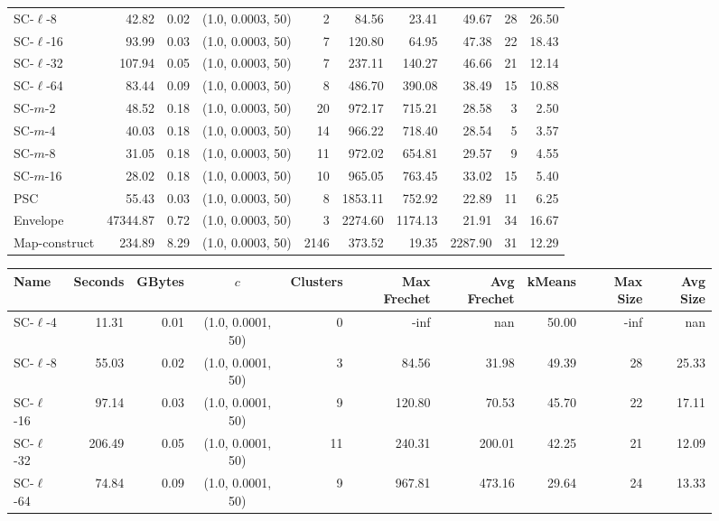 \documentclass[11pt]{article}
\begin{document}
\begin{figure}
\begin{center}
\begin{minipage}{\textwidth}
{\begin{tabular}{@{}lrrcrrrrrr@{}}
        SC-$\ell$-8 & 42.82 & 0.02 & (1.0, 0.0003, 50) & 2 & 84.56 & 23.41 & 49.67 & 28 & 26.50\\
        SC-$\ell$-16 & 93.99 & 0.03 & (1.0, 0.0003, 50) & 7 & 120.80 & 64.95 & 47.38 & 22 & 18.43\\
        SC-$\ell$-32 & 107.94 & 0.05 & (1.0, 0.0003, 50) & 7 & 237.11 & 140.27 & 46.66 & 21 & 12.14\\
        SC-$\ell$-64 & 83.44 & 0.09 & (1.0, 0.0003, 50) & 8 & 486.70 & 390.08 & 38.49 & 15 & 10.88\\
        SC-$m$-2 & 48.52 & 0.18 & (1.0, 0.0003, 50) & 20 & 972.17 & 715.21 & 28.58 & 3 & 2.50\\
        SC-$m$-4 & 40.03 & 0.18 & (1.0, 0.0003, 50) & 14 & 966.22 & 718.40 & 28.54 & 5 & 3.57\\
        SC-$m$-8 & 31.05 & 0.18 & (1.0, 0.0003, 50) & 11 & 972.02 & 654.81 & 29.57 & 9 & 4.55\\
        SC-$m$-16 & 28.02 & 0.18 & (1.0, 0.0003, 50) & 10 & 965.05 & 763.45 & 33.02 & 15 & 5.40\\
        PSC & 55.43 & 0.03 & (1.0, 0.0003, 50) & 8 & 1853.11 & 752.92 & 22.89 & 11 & 6.25\\
        Envelope & 47344.87 & 0.72 & (1.0, 0.0003, 50) & 3 & 2274.60 & 1174.13 & 21.91 & 34 & 16.67\\
        Map-construct & 234.89 & 8.29 & (1.0, 0.0003, 50) & 2146 & 373.52 & 19.35 & 2287.90 & 31 & 12.29\\
        \bottomrule
    \end{tabular}
    }
    {
    \begin{tabular}{@{}lrrcrrrrrr@{}}
        \toprule
        Name & Seconds & GBytes & $c$ & Clusters & Max Frechet & Avg Frechet & kMeans & Max Size & Avg Size\\
        \midrule
        SC-$\ell$-4 & 11.31 & 0.01 & (1.0, 0.0001, 50) & 0 & -inf & nan & 50.00 & -inf & nan\\
        SC-$\ell$-8 & 55.03 & 0.02 & (1.0, 0.0001, 50) & 3 & 84.56 & 31.98 & 49.39 & 28 & 25.33\\
        SC-$\ell$-16 & 97.14 & 0.03 & (1.0, 0.0001, 50) & 9 & 120.80 & 70.53 & 45.70 & 22 & 17.11\\
        SC-$\ell$-32 & 206.49 & 0.05 & (1.0, 0.0001, 50) & 11 & 240.31 & 200.01 & 42.25 & 21 & 12.09\\
        SC-$\ell$-64 & 74.84 & 0.09 & (1.0, 0.0001, 50) & 9 & 967.81 & 473.16 & 29.64 & 24 & 13.33\\

\end{tabular}}
\end{minipage}
\end{center}
\end{figure}
\end{document}
